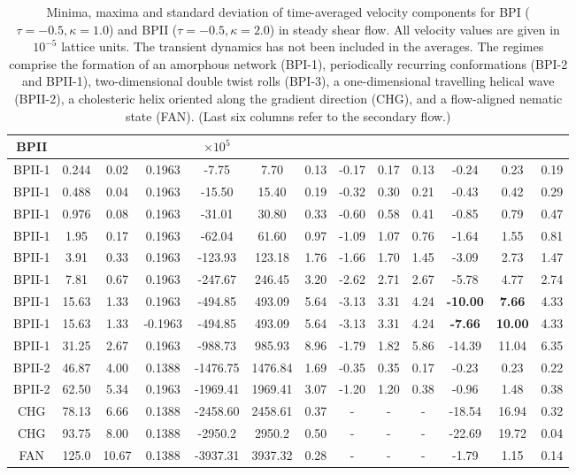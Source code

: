 \documentclass[8.5pt,twoside,twocolumn]{article}
\begin{document}
\begin{table}[htpb]
\begin{tabular}{|c||c|| c || c || c |c |c||c| c| c||c| c| c|}
BPII  & & & & $\times 10^5$ \\
\hline
BPII-1 & 0.244 &0.02 & 0.1963 &-7.75 &7.70 &0.13 &-0.17 &0.17 &0.13 &-0.24 &0.23 &0.19 \\
BPII-1 & 0.488 &0.04 & 0.1963 &-15.50 &15.40 &0.19 &-0.32 &0.30 &0.21 &-0.43 &0.42 &0.29 \\
BPII-1 & 0.976 &0.08 & 0.1963 &-31.01 &30.80 &0.33 &-0.60 &0.58 &0.41 &-0.85 &0.79 &0.47 \\
BPII-1 & 1.95 &0.17  & 0.1963 &-62.04  &61.60 & 0.97 & -1.09 &1.07 & 0.76 & -1.64 & 1.55 & 0.81\\
BPII-1 &3.91 & 0.33& 0.1963 &-123.93 &123.18 & 1.76 &-1.66 &1.70 & 1.45 &-3.09& 2.73 &1.47\\
BPII-1 &7.81 &0.67 & 0.1963  &-247.67 &246.45 & 3.20 &-2.62 &2.71 & 2.67 &-5.78 & 4.77 &2.74\\
BPII-1 &15.63 & 1.33& 0.1963 &-494.85 &493.09 & 5.64 &-3.13 &3.31 &4.24 &\bf{-10.00} & \bf{7.66} &4.33\\
BPII-1 & 15.63 & 1.33& -0.1963&-494.85 &493.09 & 5.64 & -3.13 &3.31 &4.24 &\bf{-7.66} & \bf{10.00} &4.33\\
BPII-1 & 31.25 &2.67 & 0.1963 &-988.73 &985.93 &8.96  &-1.79 &1.82 &5.86 &-14.39 & 11.04 &6.35\\
\hline
BPII-2 & 46.87 &4.00 & 0.1388 & -1476.75 & 1476.84 &1.69 &-0.35  &0.35  & 0.17 &-0.23 &0.23  & 0.22\\
BPII-2 & 62.50 & 5.34& 0.1963 & -1969.41  & 1969.41 & 3.07 & -1.20 & 1.20 & 0.38 &-0.96 & 1.48 &0.38 \\
\hline
CHG & 78.13 & 6.66 &  0.1388 &-2458.60 & 2458.61  &0.37 &- &- &- &-18.54 &16.94 &0.32 \\
CHG & 93.75 &8.00 & 0.1388 &-2950.2  &2950.2 &0.50 &- &- &- &-22.69 & 19.72 & 0.04\\
\hline
FAN & 125.0 &10.67 & 0.1388 &-3937.31  & 3937.32 &0.28 &-  &-  &-  &-1.79 &1.15  &0.14 \\
\hline
\end{tabular}
\caption{Minima, maxima and standard deviation of time-averaged velocity components 
for BPI ($\tau=-0.5, \kappa=1.0$) and BPII ($\tau=-0.5, \kappa=2.0$) in steady 
shear flow. All velocity values are given in $10^{-5}$ lattice units. The transient dynamics 
has not been included in the averages. The regimes comprise the formation
of an amorphous network (BPI-1), periodically recurring conformations (BPI-2 and BPII-1), 
two-dimensional double twist rolls (BPI-3), a one-dimensional travelling helical wave (BPII-2), 
a cholesteric helix oriented along the gradient direction (CHG), 
and a flow-aligned nematic state (FAN).
(Last six columns refer to the secondary flow.)}
\label{tab1}
\end{table}
\end{document}
